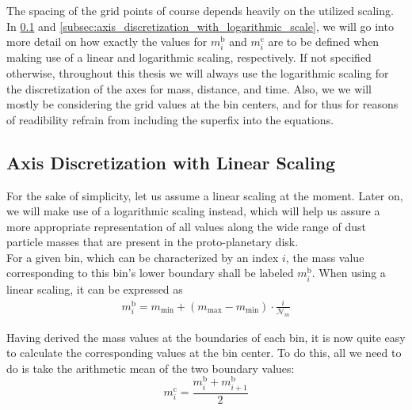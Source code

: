     The spacing of the grid points of course depends heavily on the utilized scaling. In
    \cref{subsec:axis_discretization_with_linear_scale} and
    \cref{subsec:axis_discretization_with_logarithmic_scale}, we will go into more detail on how 
    exactly the values for $m_i^\text{b}$ and $m_i^\text{c}$ are to be defined when making use of 
    a linear and logarithmic scaling, respectively. 
    If not specified otherwise, throughout this
    thesis we will always use the logarithmic scaling for the discretization of the axes for mass,
    distance, and time. Also, we we will mostly be considering the grid values at the bin centers,
    and for thus for reasons of readibility refrain from including the superfix into the equations. 


    

    \subsection{Axis Discretization with Linear Scaling}
    \label{subsec:axis_discretization_with_linear_scale}

        For the sake of simplicity, let us assume a linear scaling at the moment. Later on, we 
        will make use of a logarithmic scaling instead, which will help us assure a more 
        appropriate representation of all values along the wide range of dust particle masses 
        that are present in the proto-planetary disk. \\
    
        For a given bin, which can be characterized by an index $i$, the mass value corresponding 
        to this bin's lower boundary shall be labeled $m_i^\text{b}$. When using a linear scaling,
        it can be expressed as
        \begin{align}
          m_i^\text{b}=m_\text{min}+(m_\text{max}-m_\text{min})\cdot\frac{i}{\mathcal N_m}
        \end{align}

        Having derived the mass values at the boundaries of each bin, it is now quite easy to 
        calculate the corresponding values at the bin center. To do this, all we need to do is take 
        the arithmetic mean of the two boundary values:
        \begin{equation}
            m_i^\text{c}
                =\frac{m_i^\text{b}+m_{i+1}^\text{b}}{2}
        \end{equation}
        
